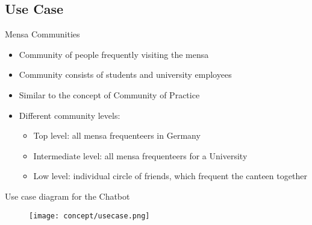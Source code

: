 \subsection{Use Case}
\begin{frame}{Mensa Communities}
  \begin{itemize}
    \item Community of people frequently visiting the mensa
    \item Community consists of students and university employees
    \item Similar to the concept of Community of Practice %
    \item Different community levels:
          \begin{itemize}
            \item Top level: all mensa frequenteers in Germany
            \item Intermediate level: all mensa frequenteers for a University
            \item Low level: individual circle of friends, which frequent the canteen together %
          \end{itemize}
  \end{itemize}
\end{frame}




\begin{frame}{Use case diagram for the Chatbot}
  \begin{figure}
    \centering
    \texttt{[image: concept/usecase.png]}

  \end{figure}
\end{frame}

